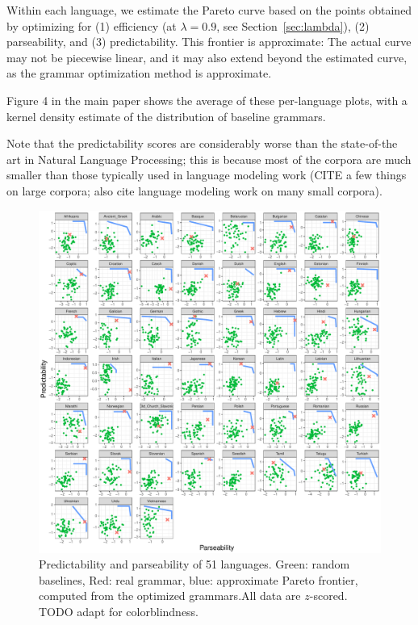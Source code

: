 \documentclass[10pt,twoside,lineno]{article}
\begin{document}
Within each language, we estimate the Pareto curve based on the points obtained by optimizing for (1) efficiency (at $\lambda = 0.9$, see Section~\ref{sec:lambda}), (2) parseability, and (3) predictability.
This frontier is approximate:
The actual curve may not be piecewise linear, and it may also extend beyond the estimated curve, as the grammar optimization method is approximate.

Figure 4 in the main paper shows the average of these per-language plots, with a kernel density estimate of the distribution of baseline grammars. 



Note that the predictability scores are considerably worse than the state-of-the art in Natural Language Processing; this is because most of the corpora are much smaller than those typically used in language modeling work (CITE a few things on large corpora; also cite language modeling work on many small corpora).




\begin{figure}
\centering
\includegraphics[width=\textwidth]{../results/plane/pareto-plane-perLanguage.pdf}
\caption[Predictability and Parseability]{Predictability and parseability of 51 languages. Green: random baselines, Red: real grammar, blue: approximate Pareto frontier, computed from the optimized grammars.\footnotemark All data are $z$-scored. TODO adapt for colorblindness.}\label{fig:pareto-per-lang}
\end{figure}
\end{document}
